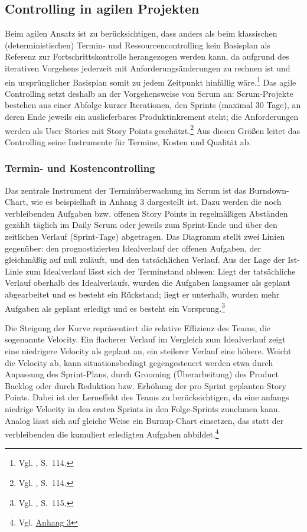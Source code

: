 \documentclass[
    12pt, 
    a4paper,
    ]{scrartcl} %
\begin{document}
\subsection{Controlling in agilen Projekten}
Beim agilen Ansatz ist zu berücksichtigen, dass anders als beim klassischen (deterministischen) Termin- und Ressourcencontrolling kein Basisplan als Referenz zur Fortschrittskontrolle herangezogen werden kann, da aufgrund des iterativen Vorgehens jederzeit mit Anforderungsänderungen zu rechnen ist und ein ursprünglicher Basisplan somit zu jedem Zeitpunkt hinfällig wäre.\footnote{Vgl. \cite{Mayrhofer_HybridesProjektmanagement}, S.~114.} Das agile Controlling setzt deshalb an der Vorgehensweise von Scrum an: Scrum-Projekte bestehen aus einer Abfolge kurzer Iterationen, den Sprints (maximal 30 Tage), an deren Ende jeweils ein auslieferbares Produktinkrement steht; die Anforderungen werden als User Stories mit Story Points geschätzt.\footnote{Vgl. \cite{Beiderwieden_ProjektmanagementIT}, S.~114.} Aus diesen Größen leitet das Controlling seine Instrumente für Termine, Kosten und Qualität ab.

\subsubsection{Termin- und Kostencontrolling}
Das zentrale Instrument der Terminüberwachung im Scrum ist das Burndown-Chart, wie es beispielhaft in Anhang 3 dargestellt ist. Dazu werden die noch verbleibenden Aufgaben bzw. offenen Story Points in regelmäßigen Abständen gezählt täglich im Daily Scrum oder jeweils zum Sprint-Ende und über den zeitlichen Verlauf (Sprint-Tage) abgetragen. Das Diagramm stellt zwei Linien gegenüber: den prognostizierten Idealverlauf der offenen Aufgaben, der gleichmäßig auf null zuläuft, und den tatsächlichen Verlauf. Aus der Lage der Ist-Linie zum Idealverlauf lässt sich der Terminstand ablesen: Liegt der tatsächliche Verlauf oberhalb des Idealverlaufs, wurden die Aufgaben langsamer als geplant abgearbeitet und es besteht ein Rückstand; liegt er unterhalb, wurden mehr Aufgaben als geplant erledigt und es besteht ein Vorsprung.\footnote{Vgl. \cite{Mayrhofer_HybridesProjektmanagement}, S.~115.}

Die Steigung der Kurve repräsentiert die relative Effizienz des Teams, die sogenannte Velocity. Ein flacherer Verlauf im Vergleich zum Idealverlauf zeigt eine niedrigere Velocity als geplant an, ein steilerer Verlauf eine höhere. Weicht die Velocity ab, kann situationsbedingt gegengesteuert werden etwa durch Anpassung des Sprint-Plans, durch Grooming (Überarbeitung) des Product Backlog oder durch Reduktion bzw. Erhöhung der pro Sprint geplanten Story Points. Dabei ist der Lerneffekt des Teams zu berücksichtigen, da eine anfangs niedrige Velocity in den ersten Sprints in den Folge-Sprints zunehmen kann. Analog lässt sich auf gleiche Weise ein Burnup-Chart einsetzen, das statt der verbleibenden die kumuliert erledigten Aufgaben abbildet.\footnote{Vgl. \hyperref[sec:Anhang3]{Anhang 3}}
\end{document}
